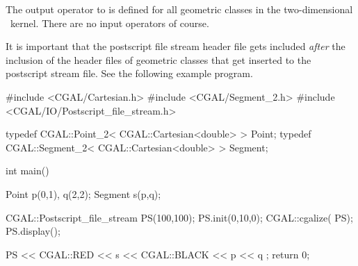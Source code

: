 The output operator to  is defined for all geometric classes 
in the two-dimensional \cgal\ kernel. There are no input operators of course.

It is important that the postscript file stream header file gets included
{\em after} the inclusion of the header files of geometric classes
that get inserted to the postscript stream file. See the following example program.

\begin{cprog}

#include <CGAL/Cartesian.h>
#include <CGAL/Segment_2.h>
#include <CGAL/IO/Postscript_file_stream.h>

typedef CGAL::Point_2< CGAL::Cartesian<double> >     Point;
typedef CGAL::Segment_2< CGAL::Cartesian<double> >   Segment;

int main()
{
    Point p(0,1), q(2,2);
    Segment s(p,q);

    CGAL::Postscript_file_stream PS(100,100);
    PS.init(0,10,0);
    CGAL::cgalize( PS);
    PS.display();

    PS << CGAL::RED << s << CGAL::BLACK << p << q ;
    return 0;
}
\end{cprog} 

